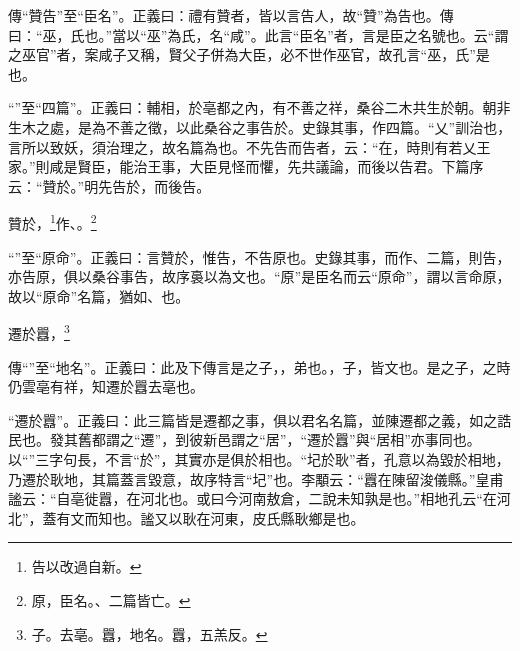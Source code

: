 {\noindent\zhuan{}\fzbyks 傳“贊告”至“臣名”。正義曰：禮有贊者，皆以言告人，故“贊”為告也。傳曰：“巫，氏也。”當以“巫”為氏，名“咸”。此言“臣名”者，言是臣之名號也。云“謂之巫官”者，案咸子又稱，賢父子併為大臣，必不世作巫官，故孔言“巫，氏”是也。 \par}

{\noindent\shu{}\fzkt “”至“四篇”。正義曰：輔相，於亳都之內，有不善之祥，桑谷二木共生於朝。朝非生木之處，是為不善之徵，以此桑谷之事告於。史錄其事，作四篇。“乂”訓治也，言所以致妖，須治理之，故名篇為也。不先告而告者，云：“在，時則有若乂王家。”則咸是賢臣，能治王事，大臣見怪而懼，先共議論，而後以告君。下篇序云：“贊於。”明先告於，而後告。 \par}

贊於，\footnote{告以改過自新。}作、。\footnote{原，臣名。、二篇皆亡。}

{\noindent\shu{}\fzkt “”至“原命”。正義曰：言贊於，惟告，不告原也。史錄其事，而作、二篇，則告，亦告原，俱以桑谷事告，故序裛以為文也。“原”是臣名而云“原命”，謂以言命原，故以“原命”名篇，猶如、也。 \par}

遷於囂，\footnote{子。去亳。囂，地名。囂，五羔反。}

{\noindent\zhuan{}\fzbyks 傳“”至“地名”。正義曰：此及下傳言是之子，，弟也。，子，皆文也。是之子，之時仍雲亳有祥，知遷於囂去亳也。 \par}

{\noindent\shu{}\fzkt “遷於囂”。正義曰：此三篇皆是遷都之事，俱以君名名篇，並陳遷都之義，如之誥民也。發其舊都謂之“遷”，到彼新邑謂之“居”，“遷於囂”與“居相”亦事同也。以“”三字句長，不言“於”，其實亦是俱於相也。“圮於耿”者，孔意以為毀於相地，乃遷於耿地，其篇蓋言毀意，故序特言“圮”也。李顒云：“囂在陳留浚儀縣。”皇甫謐云：“自亳徙囂，在河北也。或曰今河南敖倉，二說未知孰是也。”相地孔云“在河北”，蓋有文而知也。謐又以耿在河東，皮氏縣耿鄉是也。 \par}

